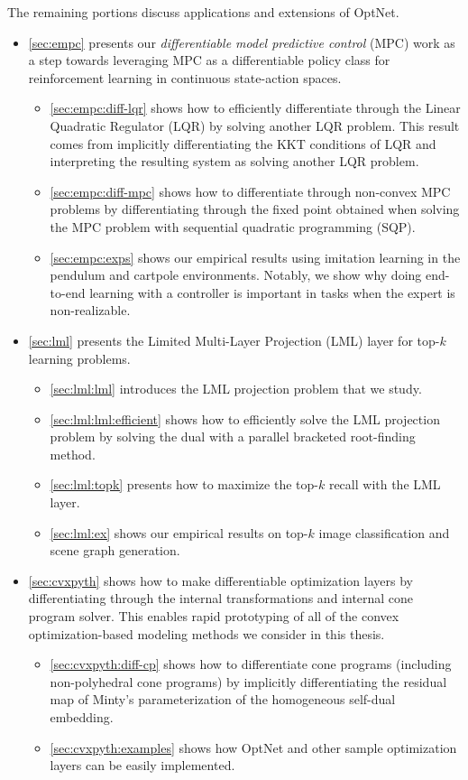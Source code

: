 \vspace{4mm}
The remaining portions discuss applications and
extensions of OptNet.
\begin{itemize}
\item \cref{sec:empc} presents our
  \emph{differentiable model predictive control} (MPC) work
  as a step towards leveraging MPC as a differentiable
  policy class for reinforcement learning in continuous
  state-action spaces.
  \begin{itemize}
  \item \cref{sec:empc:diff-lqr} shows how to efficiently
    differentiate through the Linear Quadratic Regulator (LQR)
    by solving another LQR problem.
    This result comes from implicitly differentiating the KKT
    conditions of LQR and interpreting the resulting system
    as solving another LQR problem.
  \item \cref{sec:empc:diff-mpc} shows how to differentiate
    through non-convex MPC problems by differentiating through the
    fixed point obtained when solving the MPC problem with
    sequential quadratic programming (SQP).
  \item \cref{sec:empc:exps} shows our empirical results
    using imitation learning in the pendulum and cartpole
    environments.
    Notably, we show why doing end-to-end learning with
    a controller is important in tasks when the expert
    is non-realizable.
  \end{itemize}
\item \cref{sec:lml} presents the Limited Multi-Layer Projection
  (LML) layer for top-$k$ learning problems.
  \begin{itemize}
  \item \cref{sec:lml:lml} introduces the LML projection problem
    that we study.
  \item \cref{sec:lml:lml:efficient} shows how to efficiently
    solve the LML projection problem by solving the dual
    with a parallel bracketed root-finding method.
  \item \cref{sec:lml:topk} presents how to maximize
    the top-$k$ recall with the LML layer.
  \item \cref{sec:lml:ex} shows our empirical results on
    top-$k$ image classification and scene graph generation.
  \end{itemize}
\item \cref{sec:cvxpyth} shows how to make differentiable
  \cvxpy optimization layers by differentiating through
  the internal transformations and internal cone program solver.
  This enables rapid prototyping of all of the convex
  optimization-based modeling methods we consider in this thesis.
  \begin{itemize}
  \item \cref{sec:cvxpyth:diff-cp} shows how to differentiate
    cone programs (including non-polyhedral cone programs)
    by implicitly differentiating the residual map of
    Minty's parameterization of the homogeneous
    self-dual embedding.
  \item \cref{sec:cvxpyth:examples} shows how OptNet and
    other sample optimization layers can be easily implemented.
  \end{itemize}
\end{itemize}

